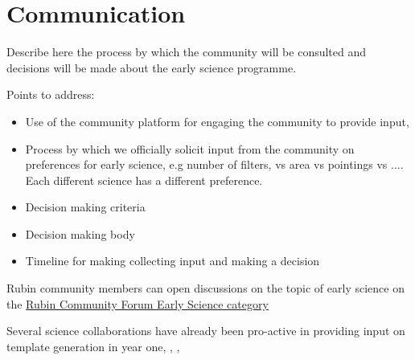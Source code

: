 
\section{Communication}

Describe here the process by which the community will be consulted and decisions will be made about the early science programme. 

Points to address:
\begin{itemize}
\item Use of the community platform for engaging the community to provide input,
\item Process by which we officially solicit  input from the community on preferences for early science, e.g number of filters, vs area vs pointings vs .... Each different science has a different preference. 
\item Decision making criteria 
\item Decision making body
\item Timeline for making collecting input and making a decision
\end{itemize}

Rubin community members can open discussions on the topic of early science on the \href{https://community.lsst.org/t/about-the-early-science-category/5775}{Rubin Community Forum Early Science category}

Several science collaborations have already been pro-active in providing input on template generation in year one, , , 
